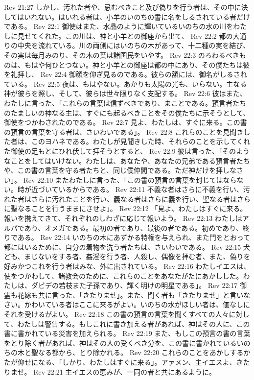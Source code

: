 Rev 21:27  しかし、汚れた者や、忌むべきこと及び偽りを行う者は、その中に決してはいれない。はいれる者は、小羊のいのちの書に名をしるされている者だけである。
Rev 22:1  御使はまた、水晶のように輝いているいのちの水の川をわたしに見せてくれた。この川は、神と小羊との御座から出て、
Rev 22:2  都の大通りの中央を流れている。川の両側にはいのちの木があって、十二種の実を結び、その実は毎月みのり、その木の葉は諸国民をいやす。
Rev 22:3  のろわるべきものは、もはや何ひとつない。神と小羊との御座は都の中にあり、その僕たちは彼を礼拝し、
Rev 22:4  御顔を仰ぎ見るのである。彼らの額には、御名がしるされている。
Rev 22:5  夜は、もはやない。あかりも太陽の光も、いらない。主なる神が彼らを照し、そして、彼らは世々限りなく支配する。
Rev 22:6  彼はまた、わたしに言った、「これらの言葉は信ずべきであり、まことである。預言者たちのたましいの神なる主は、すぐにも起るべきことをその僕たちに示そうとして、御使をつかわされたのである。
Rev 22:7  見よ、わたしは、すぐに来る。この書の預言の言葉を守る者は、さいわいである」。
Rev 22:8  これらのことを見聞きした者は、このヨハネである。わたしが見聞きした時、それらのことを示してくれた御使の足もとにひれ伏して拝そうとすると、
Rev 22:9  彼は言った、「そのようなことをしてはいけない。わたしは、あなたや、あなたの兄弟である預言者たちや、この書の言葉を守る者たちと、同じ僕仲間である。ただ神だけを拝しなさい」。
Rev 22:10  またわたしに言った、「この書の預言の言葉を封じてはならない。時が近づいているからである。
Rev 22:11  不義な者はさらに不義を行い、汚れた者はさらに汚れたことを行い、義なる者はさらに義を行い、聖なる者はさらに聖なることを行うままにさせよ」。
Rev 22:12  「見よ、わたしはすぐに来る。報いを携えてきて、それぞれのしわざに応じて報いよう。
Rev 22:13  わたしはアルパであり、オメガである。最初の者であり、最後の者である。初めであり、終りである。
Rev 22:14  いのちの木にあずかる特権を与えられ、また門をとおって都にはいるために、自分の着物を洗う者たちは、さいわいである。
Rev 22:15  犬ども、まじないをする者、姦淫を行う者、人殺し、偶像を拝む者、また、偽りを好みかつこれを行う者はみな、外に出されている。
Rev 22:16  わたしイエスは、使をつかわして、諸教会のために、これらのことをあなたがたにあかしした。わたしは、ダビデの若枝また子孫であり、輝く明けの明星である」。
Rev 22:17  御霊も花嫁も共に言った、「きたりませ」。また、聞く者も「きたりませ」と言いなさい。かわいている者はここに来るがよい。いのちの水がほしい者は、価なしにそれを受けるがよい。
Rev 22:18  この書の預言の言葉を聞くすべての人々に対して、わたしは警告する。もしこれに書き加える者があれば、神はその人に、この書に書かれている災害を加えられる。
Rev 22:19  また、もしこの預言の書の言葉をとり除く者があれば、神はその人の受くべき分を、この書に書かれているいのちの木と聖なる都から、とり除かれる。
Rev 22:20  これらのことをあかしするかたが仰せになる、「しかり、わたしはすぐに来る」。アァメン、主イエスよ、きたりませ。
Rev 22:21  主イエスの恵みが、一同の者と共にあるように。


